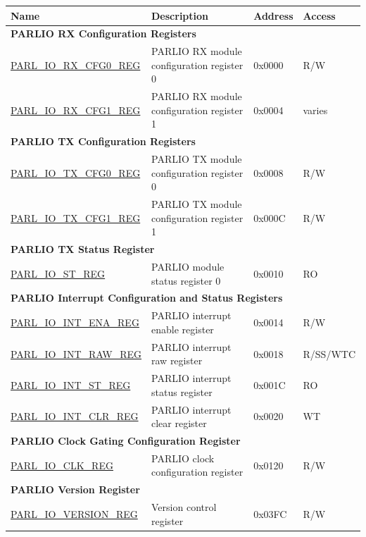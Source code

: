 \begin{longtable}{ | p{4cm} | p{8.2cm} | p{1.3cm} | p{1.6cm} | }
\hline\rowcolor{lightgray}
\textbf{Name} & \textbf{Description} &  \textbf{Address} & \textbf{Access} \\ \hline
\endhead
\multicolumn{4}{|l|}{\textbf{PARLIO RX Configuration Registers}} \\ \hline
\hyperref[regdesc:PARLIORXCFG0REG]{PARL\_IO\_RX\_CFG0\_REG} & PARLIO RX module configuration register 0 & 0x0000 & R/W \\ \hline
\hyperref[regdesc:PARLIORXCFG1REG]{PARL\_IO\_RX\_CFG1\_REG} & PARLIO RX module configuration register 1 & 0x0004 & varies \\ \hline
\multicolumn{4}{|l|}{\textbf{PARLIO TX Configuration Registers}} \\ \hline
\hyperref[regdesc:PARLIOTXCFG0REG]{PARL\_IO\_TX\_CFG0\_REG} & PARLIO TX module configuration register 0 & 0x0008 & R/W \\ \hline
\hyperref[regdesc:PARLIOTXCFG1REG]{PARL\_IO\_TX\_CFG1\_REG} & PARLIO TX module configuration register 1 & 0x000C & R/W \\ \hline
\multicolumn{4}{|l|}{\textbf{PARLIO TX Status Register}} \\ \hline
\hyperref[regdesc:PARLIOSTREG]{PARL\_IO\_ST\_REG} & PARLIO module status register 0 & 0x0010 & RO \\ \hline
\multicolumn{4}{|l|}{\textbf{PARLIO Interrupt Configuration and Status Registers}} \\ \hline
\hyperref[regdesc:PARLIOINTENAREG]{PARL\_IO\_INT\_ENA\_REG} & PARLIO interrupt enable register & 0x0014 & R/W \\ \hline
\hyperref[regdesc:PARLIOINTRAWREG]{PARL\_IO\_INT\_RAW\_REG} & PARLIO interrupt raw register & 0x0018 & R/SS/WTC \\ \hline
\hyperref[regdesc:PARLIOINTSTREG]{PARL\_IO\_INT\_ST\_REG} & PARLIO interrupt status register & 0x001C & RO \\ \hline
\hyperref[regdesc:PARLIOINTCLRREG]{PARL\_IO\_INT\_CLR\_REG} & PARLIO interrupt clear register & 0x0020 & WT \\ \hline
\multicolumn{4}{|l|}{\textbf{PARLIO Clock Gating Configuration Register}} \\ \hline
\hyperref[regdesc:PARLIOCLKREG]{PARL\_IO\_CLK\_REG} & PARLIO clock configuration register & 0x0120 & R/W \\ \hline
\multicolumn{4}{|l|}{\textbf{PARLIO Version Register}} \\ \hline
\hyperref[regdesc:PARLIOVERSIONREG]{PARL\_IO\_VERSION\_REG} & Version control register & 0x03FC & R/W \\ \hline
\end{longtable}
